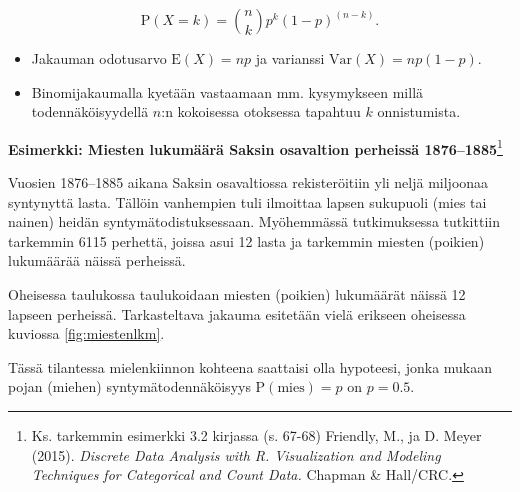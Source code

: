 \documentclass[
]{book}
\providecommand{\tightlist}{%
  \setlength{\itemsep}{0pt}\setlength{\parskip}{0pt}}
\begin{document}
\[
\text{P}(X=k) = \binom nk p^k (1-p)^{(n-k)}.
\]

\begin{itemize}
\tightlist
\item
  Jakauman odotusarvo \(\text{E}(X)=np\) ja varianssi \(\mathrm{Var}(X) = n p (1-p)\).
\item
  Binomijakaumalla kyetään vastaamaan mm. kysymykseen millä todennäköisyydellä \(n\):n kokoisessa otoksessa tapahtuu \(k\) onnistumista.
\end{itemize}

\begin{eblock}{}
\textbf{Esimerkki: Miesten lukumäärä Saksin osavaltion perheissä 1876--1885}\footnote{Ks. tarkemmin esimerkki 3.2 kirjassa (s. 67-68) Friendly, M., ja D. Meyer (2015). \emph{Discrete Data Analysis with R. Visualization and Modeling Techniques for Categorical and Count Data.} Chapman \& Hall/CRC.}

Vuosien 1876--1885 aikana Saksin osavaltiossa rekisteröitiin yli neljä miljoonaa syntynyttä lasta. Tällöin vanhempien tuli ilmoittaa lapsen sukupuoli (mies tai nainen) heidän syntymätodistuksessaan. Myöhemmässä tutkimuksessa tutkittiin tarkemmin 6115 perhettä, joissa asui 12 lasta ja tarkemmin miesten (poikien) lukumäärää näissä perheissä.

Oheisessa taulukossa taulukoidaan miesten (poikien) lukumäärät näissä 12 lapseen perheissä. Tarkasteltava jakauma esitetään vielä erikseen oheisessa kuviossa \ref{fig:miestenlkm}.

Tässä tilantessa mielenkiinnon kohteena saattaisi olla hypoteesi, jonka mukaan pojan (miehen) syntymätodennäköisyys \(\text{P}(\mathrm{mies}) = p\) on \(p=0.5\).

\end{eblock}

\begin{table}
\centering\begingroup\fontsize{12}{14}\selectfont

\endgroup{}
\end{table}
\end{document}
